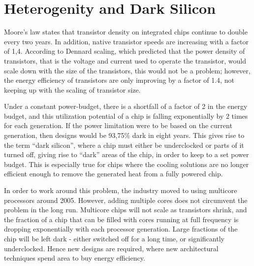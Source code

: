 
\section{Heterogenity and Dark Silicon}
\label{sec:dark-silicon}

Moore's law states that transistor density on integrated chips continue to double every
two years. In addition, native transistor speeds are increasing with a factor of 1,4.
According to Dennard scaling, which predicted that the power density of transistors, that
is the voltage and current used to operate the transistor, would scale down with the
size of the transistors, this would not be a problem; however, the energy efficiency
of transistors are only improving by a factor of 1.4, not keeping up with the scaling
of transistor size.

Under a constant power-budget, there is a shortfall of a factor of 2 in the energy budget,
and this utilization potential of a chip is falling exponentially by 2 times for each generation.
If the power limitation were to be based on the current generation, then designs would be 93,75\% dark in eight years.
This gives rise to the term ``dark silicon'', where a chip must either be underclocked or parts of
it turned off, giving rise to ``dark'' areas of the chip, in order to keep to a set power budget.
This is especially true for chips where the cooling solutions are no longer efficient enough to remove
the generated heat from a fully powered chip.

In order to work around this problem, the industry moved to using multicore processors around 2005.
However, adding multiple cores does not circumvent the problem in the long run.
Multicore chips will not scale as transistors shrink, and the fraction of a chip that can be filled with cores running at full frequency is dropping exponentially with each processor generation. 
Large fractions of the chip will be left dark - either switched off for a long time, or significantly underclocked.
Hence new designs are required, where new architectural techniques spend area to buy energy efficiency. \cite{dark-silicon}

